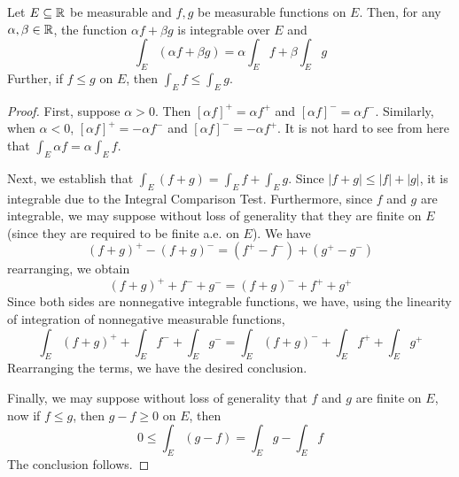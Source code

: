 \begin{theorem}
    Let $E\subseteq\mathbb{R}$ be measurable and $f,g$ be measurable functions on $E$. Then, for any $\alpha,\beta\in\mathbb{R}$, the function $\alpha f + \beta g$ is integrable over $E$ and 
    \begin{equation*}
        \int_E(\alpha f + \beta g) = \alpha\int_E f + \beta\int_E g
    \end{equation*}
    Further, if $f\le g$ on $E$, then $\int_E f\le\int_E g$.
\end{theorem}
\begin{proof}
    First, suppose $\alpha > 0$. Then $[\alpha f]^+ = \alpha f^+$ and $[\alpha f]^- = \alpha f^-$. Similarly, when $\alpha < 0$, $[\alpha f]^+ = -\alpha f^-$ and $[\alpha f]^- = -\alpha f^+$. It is not hard to see from here that $\int_E \alpha f = \alpha\int_E f$. 

    Next, we establish that $\int_E(f + g) = \int_E f + \int_E g$. Since $|f + g|\le |f| + |g|$, it is integrable due to the Integral Comparison Test. Furthermore, since $f$ and $g$ are integrable, we may suppose without loss of generality that they are finite on $E$ (since they are required to be finite a.e. on $E$). We have 
    \begin{equation*}
        (f + g)^+ - (f + g)^- = (f^+ - f^-) + (g^+ - g^-)
    \end{equation*}
    rearranging, we obtain 
    \begin{equation*}
        (f + g)^+ + f^- + g^- = (f + g)^-  + f^+ + g^+
    \end{equation*}
    Since both sides are nonnegative integrable functions, we have, using the linearity of integration of nonnegative measurable functions,
    \begin{equation*}
        \int_E (f + g)^+ + \int_E f^- + \int_E g^- = \int_E (f + g)^- + \int_E f^+ + \int_E g^+
    \end{equation*}
    Rearranging the terms, we have the desired conclusion. 

    Finally, we may suppose without loss of generality that $f$ and $g$ are finite on $E$, now if $f\le g$, then $g - f\ge 0$ on $E$, then 
    \begin{equation*}
        0\le \int_E(g - f) = \int_E g - \int_E f
    \end{equation*}
    The conclusion follows.
\end{proof}

